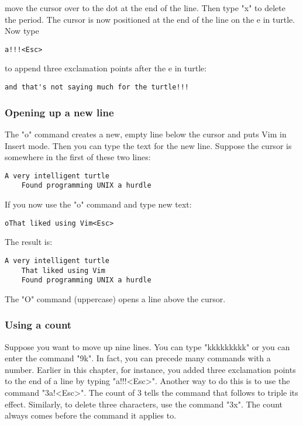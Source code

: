 move the cursor over to the dot at the end of the line. Then type "x" to delete the period.
The cursor is now positioned at the end of the line on the e in turtle.
Now type 

	\begin{Verbatim}[samepage=true]
	a!!!<Esc>
	\end{Verbatim}

to append three exclamation points after the e in turtle:

	\begin{Verbatim}[samepage=true]
	and that's not saying much for the turtle!!! 
	\end{Verbatim}

\subsubsection{Opening up a new line}

The "o" command creates a new, empty line below the cursor and puts Vim in Insert mode.
Then you can type the text for the new line.
Suppose the cursor is somewhere in the first of these two lines: 

		\begin{Verbatim}[samepage=true]
    A very intelligent turtle 
    Found programming UNIX a hurdle 
		\end{Verbatim}

If you now use the "o" command and type new text:

		\begin{Verbatim}[samepage=true]
		oThat liked using Vim<Esc>
		\end{Verbatim}

The result is:

		\begin{Verbatim}[samepage=true]
    A very intelligent turtle 
    That liked using Vim 
    Found programming UNIX a hurdle 
		\end{Verbatim}

The "O" command (uppercase) opens a line above the cursor.

\subsubsection{Using a count}

Suppose you want to move up nine lines.
You can type "kkkkkkkkk" or you can enter the command "9k".
In fact, you can precede many commands with a number.
Earlier in this chapter, for instance, you added three exclamation points to the end of a line by typing "a!!!<Esc>".
Another way to do this is to use the command "3a!<Esc>".
The count of 3 tells the command that follows to triple its effect.
Similarly, to delete three characters, use the command "3x".
The count always comes before the command it applies to.


